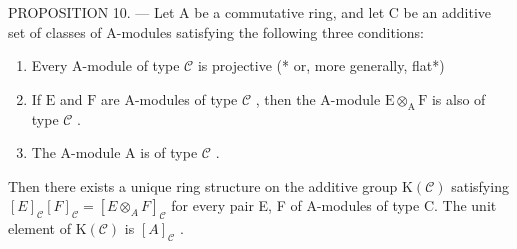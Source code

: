 PROPOSITION 10. --- Let A be a commutative ring, and let C be an additive set of classes of A-modules satisfying the following three conditions:

\begin{enumerate}
\def\labelenumi{(\roman{enumi})}
\item
  Every A-module of type \(\mathcal{C}\) is projective (* or, more generally, flat*)
\item
  If \(\mathrm{E}\) and \(\mathrm{F}\) are A-modules of type \(\mathcal{C}\) , then the A-module \(\mathrm{E} \otimes_{\mathrm{A}} \mathrm{F}\) is also of type \(\mathcal{C}\) .
\item
  The A-module A is of type \(\mathcal{C}\) .
\end{enumerate}

Then there exists a unique ring structure on the additive group \(\mathrm{K}(\mathcal{C})\) satisfying \([E]_{\mathcal{C}}[F]_{\mathcal{C}} = [E \otimes_{A} F]_{\mathcal{C}}\) for every pair E, F of A-modules of type C. The unit element of \(\mathrm{K}(\mathcal{C})\) is \([A]_{\mathcal{C}}\) .

